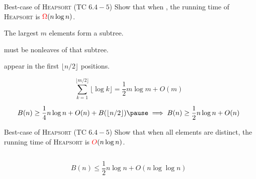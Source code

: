 \begin{frame}{}
  \begin{exampleblock}{Best-case of \textsc{Heapsort} (TC $6.4-5$)}
    Show that when , 
    the  running time of \textsc{Heapsort} is $\textcolor{red}{\Omega}(n \log n)$.
  \end{exampleblock}

  \pause
  \vspace{0.30cm}
  \centerline{}

  \begin{center}
    The largest $m$ elements form a subtree. \\[8pt] \pause

     must be nonleaves of that subtree. \\[8pt] \pause

     appear in the first $\lfloor n/2 \rfloor$ positions. \\[8pt] \pause

  \end{center}

  \pause
  \[
    \sum_{k=1}^{\lfloor m/2 \rfloor} \lfloor \log k \rfloor = \frac{1}{2} m \log m + O(m) 
  \]

  \pause
  \[
    B(n) \ge \frac{1}{4} n \log n + O(n) + B(\lfloor n/2 \rfloor) \pause \implies B(n) \ge \frac{1}{2} n \log n + O(n)
  \]
\end{frame}

\begin{frame}{}
  \begin{exampleblock}{Best-case of \textsc{Heapsort} (TC $6.4-5$)}
    Show that when all elements are distinct, 
    the  running time of \textsc{Heapsort} is $\textcolor{red}{O}(n \log n)$.
  \end{exampleblock}

  \pause
  \vspace{0.60cm}
  \centerline{}

  \pause
\end{frame}

\begin{frame}{}
  \centerline{ }

  \begin{columns}
  \end{columns}

  \pause
  \vspace{0.30cm}
  \[
    B(n) \le \frac{1}{2} n \log n + O(n \log \log n)
  \]
\end{frame}

